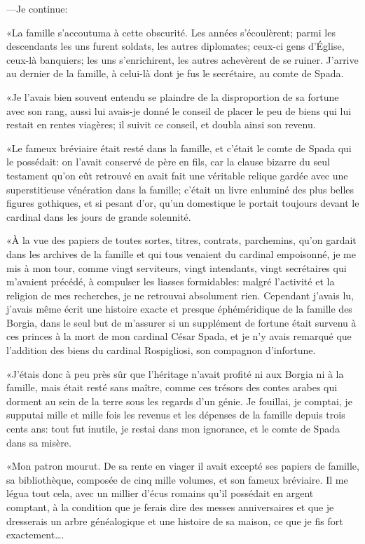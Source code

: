 —Je continue:

«La famille s'accoutuma à cette obscurité. Les années s'écoulèrent; parmi les descendants les uns furent soldats, les autres diplomates; ceux-ci gens d'Église, ceux-là banquiers; les uns s'enrichirent, les autres achevèrent de se ruiner. J'arrive au dernier de la famille, à celui-là dont je fus le secrétaire, au comte de Spada.

«Je l'avais bien souvent entendu se plaindre de la disproportion de sa fortune avec son rang, aussi lui avais-je donné le conseil de placer le peu de biens qui lui restait en rentes viagères; il suivit ce conseil, et doubla ainsi son revenu.

«Le fameux bréviaire était resté dans la famille, et c'était le comte de Spada qui le possédait: on l'avait conservé de père en fils, car la clause bizarre du seul testament qu'on eût retrouvé en avait fait une véritable relique gardée avec une superstitieuse vénération dans la famille; c'était un livre enluminé des plus belles figures gothiques, et si pesant d'or, qu'un domestique le portait toujours devant le cardinal dans les jours de grande solennité.

«À la vue des papiers de toutes sortes, titres, contrats, parchemins, qu'on gardait dans les archives de la famille et qui tous venaient du cardinal empoisonné, je me mis à mon tour, comme vingt serviteurs, vingt intendants, vingt secrétaires qui m'avaient précédé, à compulser les liasses formidables: malgré l'activité et la religion de mes recherches, je ne retrouvai absolument rien. Cependant j'avais lu, j'avais même écrit une histoire exacte et presque éphéméridique de la famille des Borgia, dans le seul but de m'assurer si un supplément de fortune était survenu à ces princes à la mort de mon cardinal César Spada, et je n'y avais remarqué que l'addition des biens du cardinal Rospigliosi, son compagnon d'infortune.

«J'étais donc à peu près sûr que l'héritage n'avait profité ni aux Borgia ni à la famille, mais était resté sans maître, comme ces trésors des contes arabes qui dorment au sein de la terre sous les regards d'un génie. Je fouillai, je comptai, je supputai mille et mille fois les revenus et les dépenses de la famille depuis trois cents ans: tout fut inutile, je restai dans mon ignorance, et le comte de Spada dans sa misère.

«Mon patron mourut. De sa rente en viager il avait excepté ses papiers de famille, sa bibliothèque, composée de cinq mille volumes, et son fameux bréviaire. Il me légua tout cela, avec un millier d'écus romains qu'il possédait en argent comptant, à la condition que je ferais dire des messes anniversaires et que je dresserais un arbre généalogique et une histoire de sa maison, ce que je fis fort exactement\dots.


